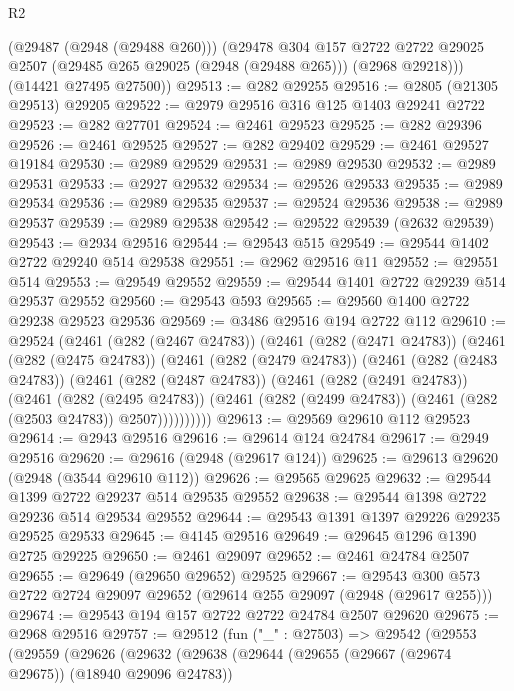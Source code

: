 \begin{lexlean}{R2}
\begin{coremodule}
        (@29487 (@2948 (@29488 @260)))
        (@29478
          @304
          @157
          @2722
          @2722
          @29025
          @2507
          (@29485 @265 @29025 (@2948 (@29488 @265)))
          (@2968 @29218)))
      (@14421 @27495 @27500))
@29513 := @282 @29255
@29516 := @2805 (@21305 @29513) @29205
@29522 := @2979 @29516 @316 @125 @1403 @29241 @2722
@29523 := @282 @27701
@29524 := @2461 @29523
@29525 := @282 @29396
@29526 := @2461 @29525
@29527 := @282 @29402
@29529 := @2461 @29527 @19184
@29530 := @2989 @29529
@29531 := @2989 @29530
@29532 := @2989 @29531
@29533 := @2927 @29532
@29534 := @29526 @29533
@29535 := @2989 @29534
@29536 := @2989 @29535
@29537 := @29524 @29536
@29538 := @2989 @29537
@29539 := @2989 @29538
@29542 := @29522 @29539 (@2632 @29539)
@29543 := @2934 @29516
@29544 := @29543 @515
@29549 := @29544 @1402 @2722 @29240 @514 @29538
@29551 := @2962 @29516 @11
@29552 := @29551 @514
@29553 := @29549 @29552
@29559 := @29544 @1401 @2722 @29239 @514 @29537 @29552
@29560 := @29543 @593
@29565 := @29560 @1400 @2722 @29238 @29523 @29536
@29569 := @3486 @29516 @194 @2722 @112
@29610 := @29524
    (@2461
      (@282 (@2467 @24783))
      (@2461
        (@282 (@2471 @24783))
        (@2461
          (@282 (@2475 @24783))
          (@2461
            (@282 (@2479 @24783))
            (@2461
              (@282 (@2483 @24783))
              (@2461
                (@282 (@2487 @24783))
                (@2461
                  (@282 (@2491 @24783))
                  (@2461
                    (@282 (@2495 @24783))
                    (@2461 (@282 (@2499 @24783)) (@2461 (@282 (@2503 @24783)) @2507))))))))))
@29613 := @29569 @29610 @112 @29523
@29614 := @2943 @29516
@29616 := @29614 @124 @24784
@29617 := @2949 @29516
@29620 := @29616 (@2948 (@29617 @124))
@29625 := @29613 @29620 (@2948 (@3544 @29610 @112))
@29626 := @29565 @29625
@29632 := @29544 @1399 @2722 @29237 @514 @29535 @29552
@29638 := @29544 @1398 @2722 @29236 @514 @29534 @29552
@29644 := @29543 @1391 @1397 @29226 @29235 @29525 @29533
@29645 := @4145 @29516
@29649 := @29645 @1296 @1390 @2725 @29225
@29650 := @2461 @29097
@29652 := @2461 @24784 @2507
@29655 := @29649 (@29650 @29652) @29525
@29667 := @29543 @300 @573 @2722 @2724 @29097 @29652 (@29614 @255 @29097 (@2948 (@29617 @255)))
@29674 := @29543 @194 @157 @2722 @2722 @24784 @2507 @29620
@29675 := @2968 @29516
@29757 := @29512
    (fun ("_" : @27503) =>
    @29542
      (@29553
        (@29559
          (@29626
            (@29632
              (@29638
                (@29644
                  (@29655 (@29667 (@29674 @29675)) (@18940 @29096 @24783))

\end{coremodule}
\end{lexlean}
